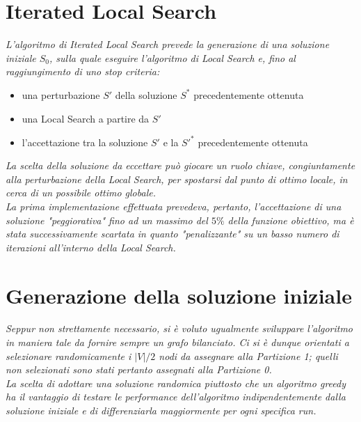 \documentclass[12pt,titlepage,oneside]{article}
\begin{document}
\section{Iterated Local Search}
\textit{L'algoritmo di Iterated Local Search prevede la generazione di una soluzione iniziale $S_0$, sulla quale eseguire l'algoritmo di Local Search e, fino al raggiungimento di uno stop criteria:}
\begin{itemize}
  \item una perturbazione $S'$ della soluzione $S^*$ precedentemente ottenuta
  \item una Local Search a partire da $S'$ 
  \item l'accettazione tra la soluzione $S'$ e la $S'^*$ precedentemente ottenuta
\end{itemize}
\textit{La scelta della soluzione da eccettare può giocare un ruolo chiave, congiuntamente alla perturbazione della Local Search, per spostarsi dal punto di ottimo locale, in cerca di un possibile ottimo globale.\\
La prima implementazione effettuata prevedeva, pertanto, l'accettazione di una soluzione "peggiorativa" fino ad un massimo del $5\%$ della funzione obiettivo, ma è stata successivamente scartata in quanto "penalizzante" su un basso numero di iterazioni all'interno della Local Search.}

\section{Generazione della soluzione iniziale}
\textit{Seppur non strettamente necessario, si è voluto ugualmente sviluppare l'algoritmo in maniera tale da fornire sempre un grafo bilanciato. Ci si è dunque orientati a selezionare randomicamente i $|V|/2$ nodi da assegnare alla Partizione 1; quelli non selezionati sono stati pertanto assegnati alla Partizione 0.\\
La scelta di adottare una soluzione randomica piuttosto che un algoritmo greedy ha il vantaggio di testare le performance dell'algoritmo indipendentemente dalla soluzione iniziale e di differenziarla maggiormente per ogni specifica run.}
\end{document}
